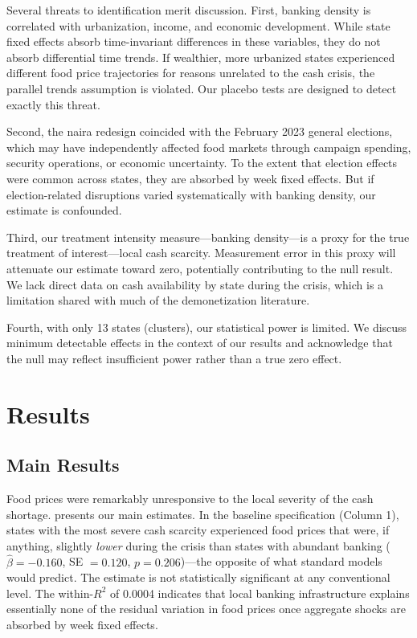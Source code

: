 \documentclass[12pt]{article}
\begin{document}
Several threats to identification merit discussion. First, banking density is correlated with urbanization, income, and economic development. While state fixed effects absorb time-invariant differences in these variables, they do not absorb differential time trends. If wealthier, more urbanized states experienced different food price trajectories for reasons unrelated to the cash crisis, the parallel trends assumption is violated. Our placebo tests are designed to detect exactly this threat.

Second, the naira redesign coincided with the February 2023 general elections, which may have independently affected food markets through campaign spending, security operations, or economic uncertainty. To the extent that election effects were common across states, they are absorbed by week fixed effects. But if election-related disruptions varied systematically with banking density, our estimate is confounded.

Third, our treatment intensity measure---banking density---is a proxy for the true treatment of interest---local cash scarcity. Measurement error in this proxy will attenuate our estimate toward zero, potentially contributing to the null result. We lack direct data on cash availability by state during the crisis, which is a limitation shared with much of the demonetization literature.

Fourth, with only 13 states (clusters), our statistical power is limited. We discuss minimum detectable effects in the context of our results and acknowledge that the null may reflect insufficient power rather than a true zero effect.


\section{Results}

\subsection{Main Results}

Food prices were remarkably unresponsive to the local severity of the cash shortage.  presents our main estimates. In the baseline specification (Column 1), states with the most severe cash scarcity experienced food prices that were, if anything, slightly \textit{lower} during the crisis than states with abundant banking ($\hat{\beta} = -0.160$, SE $= 0.120$, $p = 0.206$)---the opposite of what standard models would predict. The estimate is not statistically significant at any conventional level. The within-$R^2$ of 0.0004 indicates that local banking infrastructure explains essentially none of the residual variation in food prices once aggregate shocks are absorbed by week fixed effects.
\end{document}
